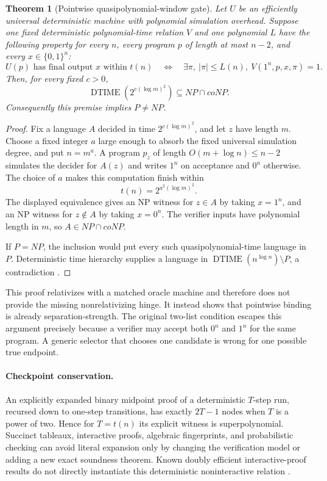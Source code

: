 \documentclass[11pt]{article}
\newtheorem{theorem}{Theorem}
\begin{document}
\begin{theorem}[Pointwise quasipolynomial-window gate]
Let \(U\) be an efficiently universal deterministic machine with polynomial
simulation overhead.  Suppose one fixed deterministic polynomial-time
relation \(V\) and one polynomial \(L\) have the following property for every
\(n\), every program \(p\) of length at most \(n-2\), and every
\(x\in\{0,1\}^n\):
\[
 U(p)\text{ has final output }x\text{ within }t(n)
 \quad\Longleftrightarrow\quad
 \exists\pi,\ |\pi|\le L(n),\ V(1^n,p,x,\pi)=1.
\]
Then, for every fixed \(c>0\),
\[
 \operatorname{DTIME}\!\left(2^{c(\log m)^2}\right)
 \subseteq NP\cap coNP.
\]
Consequently this premise implies \(P\ne NP\).
\end{theorem}
\begin{proof}
Fix a language \(A\) decided in time \(2^{c(\log m)^2}\), and let \(z\) have
length \(m\).  Choose a fixed integer \(a\) large enough to absorb the fixed
universal simulation degree, and put \(n=m^a\).  A program \(p_z\) of length
\(O(m+\log n)\le n-2\) simulates the decider for \(A(z)\) and writes
\(1^n\) on acceptance and \(0^n\) otherwise.  The choice of \(a\) makes this
computation finish within
\[
 t(n)=2^{a^2(\log m)^2}.
\]
The displayed equivalence gives an NP witness for \(z\in A\) by taking
\(x=1^n\), and an NP witness for \(z\notin A\) by taking \(x=0^n\).
The verifier inputs have polynomial length in \(m\), so \(A\in NP\cap coNP\).

If \(P=NP\), the inclusion would put every such quasipolynomial-time language
in \(P\).  Deterministic time hierarchy supplies a language in
\(\operatorname{DTIME}(n^{\log n})\setminus P\), a contradiction
\cite{hartmanisstearns1965}.
\end{proof}
This proof relativizes with a matched oracle machine and therefore does not
provide the missing nonrelativizing hinge.  It instead shows that pointwise
binding is already separation-strength.  The original two-list condition
escapes this argument precisely because a verifier may accept both
\(0^n\) and \(1^n\) for the same program.  A generic selector that chooses
one candidate is wrong for one possible true endpoint.

\paragraph{Checkpoint conservation.}
An explicitly expanded binary midpoint proof of a deterministic \(T\)-step
run, recursed down to one-step transitions, has exactly \(2T-1\) nodes when
\(T\) is a power of two.  Hence for \(T=t(n)\) its explicit witness is
superpolynomial.  Succinct tableaux, interactive proofs, algebraic
fingerprints, and probabilistic checking can avoid literal expansion only by
changing the verification model or adding a new exact soundness theorem.
Known doubly efficient interactive-proof results do not directly instantiate
this deterministic noninteractive relation \cite{cookrothblum2023,chenetal2026}.
\end{document}
